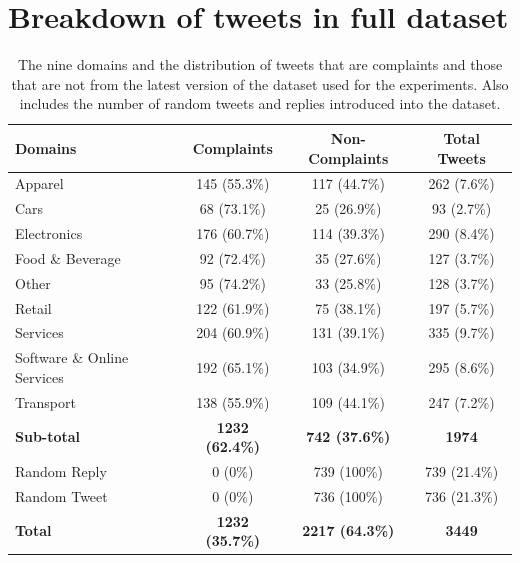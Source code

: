\section{Breakdown of tweets in full dataset}
\begin{table}[ht]
    \captionsetup{font=small}
    \centering
    \begin{tabularx}{\textwidth}{|X|c|c|c|}
        \hline
        \rowcolor[gray]{0.7}
        \textbf{Domains}            & \textbf{Complaints}   & \textbf{Non-Complaints} & \textbf{Total Tweets} \\
        \hline
        Apparel                     & 145 \small{(55.3\%)}  & 117 \small{(44.7\%)}    & 262 \small{(7.6\%)}   \\
        \hline
        Cars                        & 68 \small{(73.1\%)}   & 25 \small{(26.9\%)}     & 93 \small{(2.7\%)}    \\
        \hline
        Electronics                 & 176 \small{(60.7\%)}  & 114 \small{(39.3\%)}    & 290 \small{(8.4\%)}   \\
        \hline
        Food \& Beverage            & 92 \small{(72.4\%)}   & 35 \small{(27.6\%)}     & 127 \small{(3.7\%)}   \\
        \hline
        Other                       & 95 \small{(74.2\%)}   & 33 \small{(25.8\%)}     & 128 \small{(3.7\%)}   \\
        \hline
        Retail                      & 122 \small{(61.9\%)}  & 75 \small{(38.1\%)}     & 197 \small{(5.7\%)}   \\
        \hline
        Services                    & 204 \small{(60.9\%)}  & 131 \small{(39.1\%)}    & 335 \small{(9.7\%)}   \\
        \hline
        Software \& Online Services & 192 \small{(65.1\%)}  & 103 \small{(34.9\%)}    & 295 \small{(8.6\%)}   \\
        \hline
        Transport                   & 138 \small{(55.9\%)}  & 109 \small{(44.1\%)}    & 247 \small{(7.2\%)}   \\
        \hline
        \rowcolor[gray]{0.9}
        \textbf{Sub-total}          & \textbf{1232 \small{(62.4\%)}} & \textbf{742 \small{(37.6\%)}} & \textbf{1974}  \\
        \hline
        \hline
        Random Reply                & 0 \small{(0\%)}       & 739 \small{(100\%)}     & 739 \small{(21.4\%)}  \\
        \hline
        Random Tweet                & 0 \small{(0\%)}       & 736 \small{(100\%)}     & 736 \small{(21.3\%)}  \\
        \hline
        \hline
        \rowcolor[gray]{0.9}
        \textbf{Total}              & \textbf{1232 \small{(35.7\%)}}   & \textbf{2217 \small{(64.3\%)}}      & \textbf{3449}                  \\
        \hline
    \end{tabularx}
    \caption{The nine domains and the distribution of tweets that are complaints and those that are not from the latest version of the dataset used for the experiments. Also includes the number of random tweets and replies introduced into the dataset.}
    \label{tab: fulldataset_breakdown}
\end{table}


